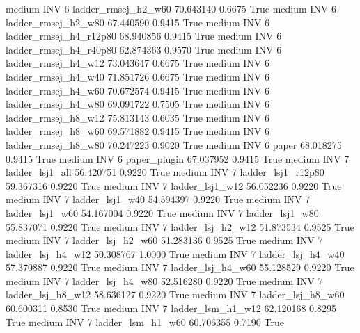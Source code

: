     medium      INV                 6    ladder_rmsej_h2_w60  70.643140      0.6675    True
    medium      INV                 6    ladder_rmsej_h2_w80  67.440590      0.9415    True
    medium      INV                 6 ladder_rmsej_h4_r12p80  68.940856      0.9415    True
    medium      INV                 6 ladder_rmsej_h4_r40p80  62.874363      0.9570    True
    medium      INV                 6    ladder_rmsej_h4_w12  73.043647      0.6675    True
    medium      INV                 6    ladder_rmsej_h4_w40  71.851726      0.6675    True
    medium      INV                 6    ladder_rmsej_h4_w60  70.672574      0.9415    True
    medium      INV                 6    ladder_rmsej_h4_w80  69.091722      0.7505    True
    medium      INV                 6    ladder_rmsej_h8_w12  75.813143      0.6035    True
    medium      INV                 6    ladder_rmsej_h8_w60  69.571882      0.9415    True
    medium      INV                 6    ladder_rmsej_h8_w80  70.247223      0.9020    True
    medium      INV                 6                  paper  68.018275      0.9415    True
    medium      INV                 6           paper_plugin  67.037952      0.9415    True
    medium      INV                 7        ladder_lsj1_all  56.420751      0.9220    True
    medium      INV                 7     ladder_lsj1_r12p80  59.367316      0.9220    True
    medium      INV                 7        ladder_lsj1_w12  56.052236      0.9220    True
    medium      INV                 7        ladder_lsj1_w40  54.594397      0.9220    True
    medium      INV                 7        ladder_lsj1_w60  54.167004      0.9220    True
    medium      INV                 7        ladder_lsj1_w80  55.837071      0.9220    True
    medium      INV                 7      ladder_lsj_h2_w12  51.873534      0.9525    True
    medium      INV                 7      ladder_lsj_h2_w60  51.283136      0.9525    True
    medium      INV                 7      ladder_lsj_h4_w12  50.308767      1.0000    True
    medium      INV                 7      ladder_lsj_h4_w40  57.370887      0.9220    True
    medium      INV                 7      ladder_lsj_h4_w60  55.128529      0.9220    True
    medium      INV                 7      ladder_lsj_h4_w80  52.516280      0.9220    True
    medium      INV                 7      ladder_lsj_h8_w12  58.636127      0.9220    True
    medium      INV                 7      ladder_lsj_h8_w60  60.600311      0.8530    True
    medium      INV                 7      ladder_lsm_h1_w12  62.120168      0.8295    True
    medium      INV                 7      ladder_lsm_h1_w60  60.706355      0.7190    True
